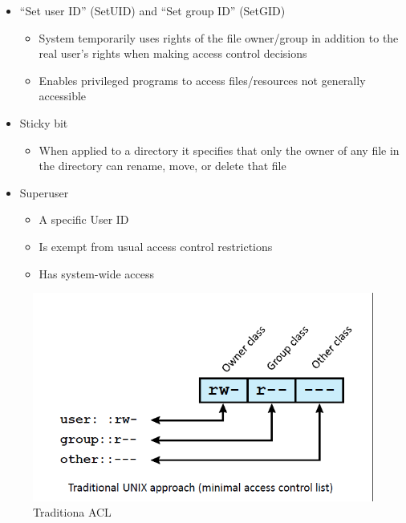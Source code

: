 \documentclass{article}
\begin{document}
\begin{itemize}
                                \item “Set user ID” (SetUID) and “Set group ID” (SetGID)
                                \begin{itemize}
                                    \item System temporarily uses rights of the file owner/group in addition to the real user’s rights when making access control decisions
                                    \item Enables privileged programs to access files/resources not generally accessible
                                \end{itemize}
                                \item Sticky bit
                                \begin{itemize}
                                    \item When applied to a directory it specifies that only the owner of any file in the directory can rename, move, or delete that file
                                \end{itemize}
                                \item Superuser
                                \begin{itemize}
                                    \item A specific User ID
                                    \item Is exempt from usual access control restrictions
                                    \item Has system-wide access
                                \end{itemize}

                            \end{itemize}
                            \begin{figure}[h]
                                \begin{center}
                                    \includegraphics[scale=0.6]{../immagini/minimal_acl.png}
                                \end{center}
                                \caption{Traditiona ACL}
                            \end{figure}
                            
\end{document}
